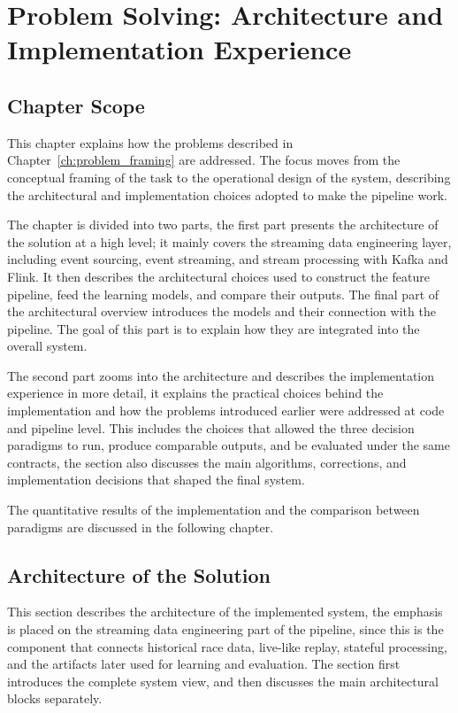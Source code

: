 \chapter{Problem Solving: Architecture and Implementation Experience}
\label{ch:problem_solving}

\section{Chapter Scope}

This chapter explains how the problems described in Chapter~\ref{ch:problem_framing} are addressed.
The focus moves from the conceptual framing of the task to the operational design of the system, describing the architectural and implementation choices adopted to make the pipeline work.

The chapter is divided into two parts, the first part presents the architecture of the solution at a high level;
it mainly covers the streaming data engineering layer, including event sourcing, event streaming, and stream processing with Kafka and Flink.
It then describes the architectural choices used to construct the feature pipeline, feed the learning models, and compare their outputs.
The final part of the architectural overview introduces the models and their connection with the pipeline.
The goal of this part is to explain how they are integrated into the overall system.

The second part zooms into the architecture and describes the implementation experience in more detail,
it explains the practical choices behind the implementation and how the problems introduced earlier were addressed at code and pipeline level.
This includes the choices that allowed the three decision paradigms to run, produce comparable outputs, and be evaluated under the same contracts,
the section also discusses the main algorithms, corrections, and implementation decisions that shaped the final system.

The quantitative results of the implementation and the comparison between paradigms are discussed in the following chapter.


\section{Architecture of the Solution}

This section describes the architecture of the implemented system, the emphasis is placed on the streaming data engineering part of the pipeline,
since this is the component that connects historical race data, live-like replay, stateful processing, and the artifacts later used for learning and evaluation.
The section first introduces the complete system view, and then discusses the main architectural blocks separately.

